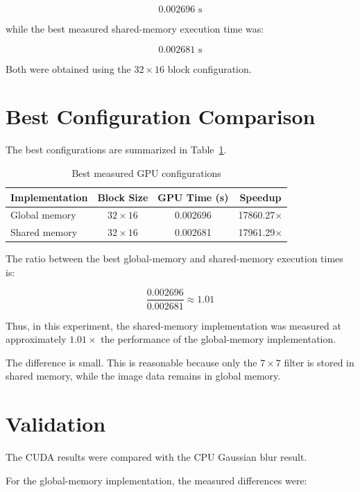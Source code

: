 \documentclass[11pt]{article}
\begin{document}
\[
\boxed{0.002696\text{ s}}
\]

while the best measured shared-memory execution time was:

\[
\boxed{0.002681\text{ s}}
\]

Both were obtained using the $32\times16$ block configuration.

\section{Best Configuration Comparison}

The best configurations are summarized in Table~\ref{tab:best}.

\begin{table}[H]
    \centering
    \caption{Best measured GPU configurations}
    \label{tab:best}
    \begin{tabular}{lccc}
        \toprule
        Implementation &
        Block Size &
        GPU Time (s) &
        Speedup \\
        \midrule
        Global memory &
        $32\times16$ &
        0.002696 &
        17860.27$\times$ \\

        Shared memory &
        $32\times16$ &
        0.002681 &
        17961.29$\times$ \\

        \bottomrule
    \end{tabular}
\end{table}

The ratio between the best global-memory and shared-memory execution
times is:

\[
\frac{0.002696}{0.002681}
\approx 1.01
\]

Thus, in this experiment, the shared-memory implementation was measured
at approximately $1.01\times$ the performance of the global-memory
implementation.

The difference is small. This is reasonable because only the $7\times7$
filter is stored in shared memory, while the image data remains in
global memory.

\section{Validation}

The CUDA results were compared with the CPU Gaussian blur result.

For the global-memory implementation, the measured differences were:
\end{document}
